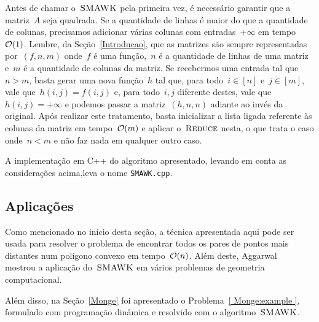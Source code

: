 Antes de chamar o~$\textsc{SMAWK}$ pela primeira vez, é necessário garantir que a matriz~$A$ seja quadrada. Se a quantidade de linhas é maior do que a quantidade de colunas, precisamos adicionar várias colunas com entradas~$+\infty$ em tempo~$\mathcal{O}(1)$. Lembre, da Seção~\ref{Introducao}, que as matrizes são sempre representadas por~$(f,n,m)$ onde~$f$ é uma função,~$n$ é a quantidade de linhas de uma matriz e~$m$ é a quantidade de colunas da matriz. Se recebermos uma entrada tal que~${ n > m }$, basta gerar uma nova função~$h$ tal que, para todo~${ i \in [n] }$ e~${ j \in [m] }$, vale que~${ h(i,j) = f(i,j) }$ e, para todo~$i,j$ diferente destes, vale que~${ h(i,j) = +\infty }$ e podemos passar a matriz~$(h,n,n)$ adiante ao invés da original. Após realizar este tratamento, basta inicializar a lista ligada referente às colunas da matriz em tempo~$\mathcal{O}(m)$ e aplicar o~$\textsc{Reduce}$ nesta, o que trata o caso onde~${ n < m }$ e não faz nada em qualquer outro caso.
 
A implementação em C++ do algoritmo apresentado, levando em conta as considerações acima,leva o nome \texttt{SMAWK.cpp}.


\subsection{Aplicações} \label{SMAWK:Appl}
Como mencionado no início desta seção, a técnica apresentada aqui pode ser usada para resolver o problema de encontrar todos os pares de pontos mais distantes num polígono convexo em tempo~$\mathcal{O}(n)$. Além deste, Aggarwal~\cite{Aggarwal:1987} mostrou a aplicação do~$\textsc{SMAWK}$ em vários problemas de geometria computacional.

Além disso, na Seção~\ref{Monge} foi apresentado o Problema~\ref{ Monge:example }, formulado com programação dinâmica e resolvido com o algoritmo~$\textsc{SMAWK}$.
